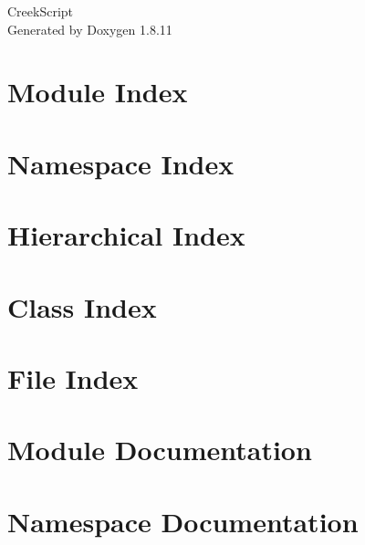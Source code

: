 \documentclass[twoside]{book}
\newcommand{\+}{\discretionary{\mbox{\scriptsize$\hookleftarrow$}}{}{}}
\newcommand{\clearemptydoublepage}{%
  \newpage{\pagestyle{empty}\cleardoublepage}%
}
\begin{document}
\hypersetup{pageanchor=false,
             bookmarksnumbered=true,
             pdfencoding=unicode
            }
\begin{titlepage}
\vspace*{7cm}
\begin{center}%
{\Large Creek\+Script }\\
\vspace*{1cm}
{\large Generated by Doxygen 1.8.11}\\
\end{center}
\end{titlepage}
\clearemptydoublepage
\tableofcontents
\clearemptydoublepage
{}
\hypersetup{pageanchor=true}

\chapter{Module Index}

\chapter{Namespace Index}

\chapter{Hierarchical Index}

\chapter{Class Index}

\chapter{File Index}

\chapter{Module Documentation}












\chapter{Namespace Documentation}

\end{document}
